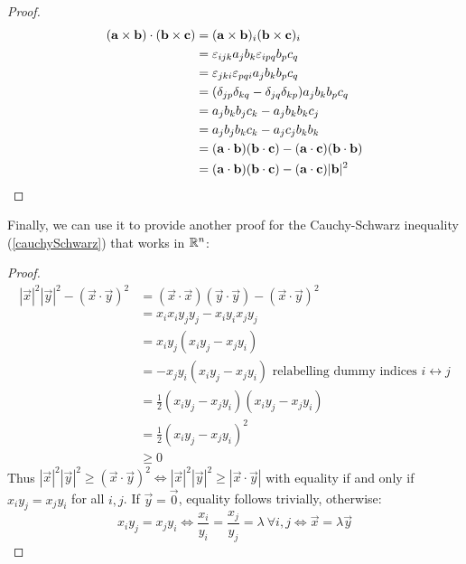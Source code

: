 \documentclass[../main.tex]{subfiles}
\begin{document}
\begin{proof}
  \begin{align*}
    (\mathbf{\bm{a}} \times \mathbf{\bm{b}}) \cdot (\mathbf{\bm{b}} \times \mathbf{\bm{c}}) &= (\mathbf{\bm{a}} \times \mathbf{\bm{b}})_i (\mathbf{\bm{b}} \times \mathbf{\bm{c}})_i \\
     &= \varepsilon_{i j k} a_j b_k \varepsilon_{i p q} b_p c_q \\
     &= \varepsilon_{j k i} \varepsilon_{p q i} a_j b_k b_p c_q \\
     &= (\delta_{j p}\delta_{k q} - \delta_{j q}\delta_{k p}) a_j b_k b_p c_q \\
     &= a_j b_k b_j c_k - a_j b_k b_k c_j \\
     &= a_j b_j b_k c_k - a_j c_j b_k b_k \\
     &= (\mathbf{\bm{a}} \cdot \mathbf{\bm{b}}) (\mathbf{\bm{b}} \cdot \mathbf{\bm{c}}) - (\mathbf{\bm{a}} \cdot \mathbf{\bm{c}}) (\mathbf{\bm{b}} \cdot \mathbf{\bm{b}}) \\
     &= (\mathbf{\bm{a}} \cdot \mathbf{\bm{b}}) (\mathbf{\bm{b}} \cdot \mathbf{\bm{c}}) - (\mathbf{\bm{a}} \cdot \mathbf{\bm{c}}) |\mathbf{\bm{b}}|^2
  \end{align*}
\end{proof}

Finally, we can use it to provide another proof for the Cauchy-Schwarz inequality (\cref{cauchySchwarz}) that works in $\mathbb{R}^{n}$:
\begin{proof}
  \begin{align*}
    |\vec{x}|^2|\vec{y}|^2 - (\vec{x} \cdot \vec{y})^2 &= (\vec{x} \cdot \vec{x})(\vec{y} \cdot \vec{y}) - (\vec{x} \cdot \vec{y})^2 \\
                                                       &= x_i x_i y_j y_j - x_i y_i x_j y_j \\
                                                       &= x_i y_j (x_i y_j - x_j y_i) \\
                                                       &= - x_j y_i (x_i y_j - x_j y_i) \text{ relabelling dummy indices $i \leftrightarrow j$}\\
                                                       &= \frac{1}{2}(x_i y_j - x_j y_i)(x_i y_j - x_j y_i) \\
                                                       &= \frac{1}{2}(x_i y_j - x_j y_i)^2 \\
                                                       &\geq 0
  \end{align*}
  Thus $|\vec{x}|^2|\vec{y}|^2 \geq (\vec{x} \cdot \vec{y})^2 \iff |\vec{x}|^2|\vec{y}|^2 \geq |\vec{x} \cdot \vec{y}|$ with equality if and only if $x_i y_j = x_j y_i$ for all $i, j$.
  If $\vec{y} = \vec{0}$, equality follows trivially, otherwise:
  \[
    x_i y_j = x_j y_i \iff \frac{x_i}{y_i} = \frac{x_j}{y_j} = \lambda\ \forall i, j \iff \vec{x} = \lambda \vec{y}
  \]
\end{proof}
\end{document}
